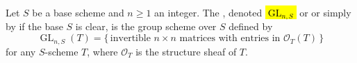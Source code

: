 \begin{definition} \label{definition:general_linear_group_over_a_scheme}
Let \(S\) be a base scheme and \(n \geq 1\) an integer.  
The , denoted \hl{$\operatorname{GL}_{n,S}$} or  or simply by  if the base $S$ is clear, is the group scheme over \(S\) defined by
$$ \operatorname{GL}_{n,S}(T) = \{\, \text{invertible } n \times n \text{ matrices with entries in } \mathcal{O}_T(T) \,\} $$
for any \(S\)-scheme \(T\), where \(\mathcal{O}_T\) is the structure sheaf of \(T\).

\end{definition}

